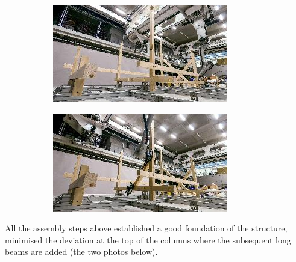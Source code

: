 \documentclass[11pt]{book}
\begin{document}
{\small \begin{figure}[H]
\centering
\begin{subfigure}[b]{0.45\textwidth}
\centering
\includegraphics[width=\textwidth]{./images/image69.jpeg}
\end{subfigure}
\hfill
\begin{subfigure}[b]{0.45\textwidth}
\centering
\includegraphics[width=\textwidth]{./images/image70.jpeg}
\end{subfigure}
\end{figure}
}

All the assembly steps above established a good foundation of the structure, minimised the deviation at the top of the columns where the subsequent long beams are added (the two photos below).  
\end{document}
